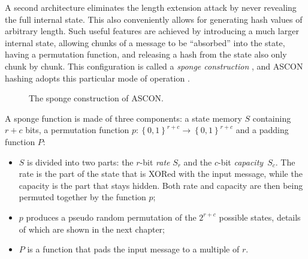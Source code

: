 A second architecture eliminates the length extension attack by never revealing the full internal state. This also conveniently allows for generating hash values of arbitrary length. Such useful features are achieved by introducing a much larger internal state, allowing chunks of a message to be ``absorbed'' into the state, having a permutation function, and releasing a hash from the state also only chunk by chunk. This configuration is called a \textit{sponge construction} \cite{guido_b_d_michaël_p_2011}, and ASCON hashing adopts this particular mode of operation \cite{ascon_specification}.

\begin{figure}[H]
    \centering
  \caption{The sponge construction of ASCON.}
\end{figure}
A sponge function is made of three components: a state memory $S$ containing ${r+c}$ bits, a permutation function $p: \left\{0,1\right\}^{r+c} \rightarrow \left\{0,1\right\}^{r+c}$ and a padding function $P$:

\begin{itemize}
  \item $S$ is divided into two parts: the $r$-bit \textit{rate} $S_r$ and the $c$-bit \textit{capacity}~$S_c$. The rate is the part of the state that is XORed with the input message, while the capacity is the part that stays hidden. Both rate and capacity are then being permuted together by the function $p$;
  \item $p$ produces a pseudo random permutation of the $2^{r+c}$ possible states, details of which are shown in the next chapter;
  \item $P$ is a function that pads the input message to a multiple of $r$.
\end{itemize}

